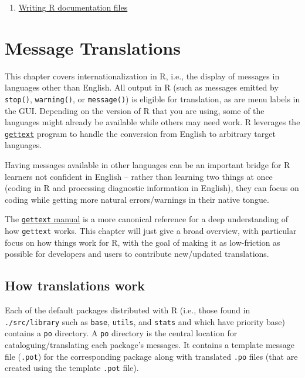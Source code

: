 \documentclass[
]{book}
\providecommand{\tightlist}{%
  \setlength{\itemsep}{0pt}\setlength{\parskip}{0pt}}
\begin{document}
\begin{enumerate}
\def\labelenumi{\arabic{enumi}.}
\tightlist
\item
  \href{https://cran.r-project.org/doc/manuals/r-release/R-exts.html\#Writing-R-documentation-files}{Writing R documentation files}
\end{enumerate}

\hypertarget{message-translations}{%
\chapter{Message Translations}\label{message-translations}}

This chapter covers internationalization in R, i.e., the display of messages in languages other than English. All
output in R (such as messages emitted by \texttt{stop()}, \texttt{warning()}, or \texttt{message()}) is eligible for translation, as
are menu labels in the GUI. Depending on the version of R that you are using, some of the languages might already
be available while others may need work. R leverages the \href{https://www.gnu.org/software/gettext/}{\texttt{gettext}} program
to handle the conversion from English to arbitrary target languages.

Having messages available in other languages can be an important bridge for R learners not confident in English --
rather than learning two things at once (coding in R and processing diagnostic information in English), they can
focus on coding while getting more natural errors/warnings in their native tongue.

The \href{https://www.gnu.org/software/gettext/manual/index.html}{\texttt{gettext} manual} is a more canonical reference for a
deep understanding of how \texttt{gettext} works. This chapter will just give a broad overview, with particular focus on
how things work for R, with the goal of making it as low-friction as possible for developers and users to contribute
new/updated translations.

\hypertarget{how-translations-work}{%
\section{How translations work}\label{how-translations-work}}

Each of the default packages distributed with R (i.e., those found in \texttt{./src/library} such as \texttt{base}, \texttt{utils},
and \texttt{stats} and which have priority base) contains a \texttt{po} directory. A \texttt{po} directory is the central location for cataloguing/translating each package's messages. It contains a template message file (\texttt{.pot}) for the corresponding package along with translated \texttt{.po} files (that are created using the template \texttt{.pot} file).
\end{document}
